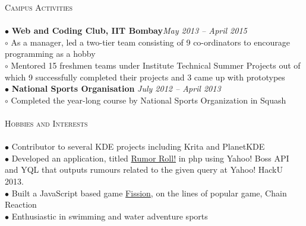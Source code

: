 \documentclass[a4paper,9pt]{article}
\begin{document}
\textcolor{myrust}{\large{\textsc{Campus Activities}}}\textcolor{mygray}{\sout{\hfill}}\\\\
\small %
$\bullet$ \textbf{Web and Coding Club, IIT Bombay}\hfill\textit{May 2013 -- April 2015}\\
\hspace*{0.35cm}$\circ$ As a manager, led a two-tier team consisting of 9 co-ordinators to encourage programming as a hobby\\
\hspace*{0.35cm}$\circ$ Mentored 15 freshmen teams under Institute Technical Summer Projects out of which 9 successfully completed their projects and 3 came up with prototypes\\
$\bullet$ \textbf{National Sports Organisation} \hfill\textit{July 2012 -- April 2013}\\
\hspace*{0.35cm}$\circ$ Completed the year-long course by National Sports Organization in Squash\\\\


\textcolor{myrust}{\large{\textsc{Hobbies and Interests}}}\textcolor{mygray}{\sout{\hfill}}\\\\
\small %
$\bullet$ Contributor to several KDE projects including Krita and PlanetKDE\\
$\bullet$ Developed an application, titled \href{https://github.com/ranveeraggarwal/Rumor-Roll}{Rumor Roll!} in php using Yahoo! Boss API and YQL that outputs rumours related to the given query at Yahoo! HackU 2013.\\
$\bullet$ Built a JavaScript based game \href{https://github.com/ranveeraggarwal/fission}{Fission}, on the lines of popular game, Chain Reaction\\
$\bullet$ Enthusiastic in swimming and water adventure sports\\
\end{document}
